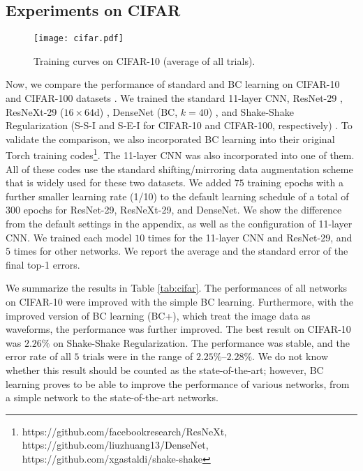 \documentclass[10pt,twocolumn,letterpaper]{article}
\begin{document}
\subsection{Experiments on CIFAR}
\begin{figure*}
\begin{center}
	\texttt{[image: cifar.pdf]}
\end{center}
\vspace{-3mm}
   \caption{Training curves on CIFAR-10 (average of all trials).}
\label{fig:cifar}
\vspace{-2mm}
\end{figure*}

Now, we compare the performance of standard and BC learning on CIFAR-10 and CIFAR-100 datasets \cite{krizhevsky2009learning}. We trained the standard 11-layer CNN, ResNet-29 \cite{xie2017aggregated}, ResNeXt-29 ($16\times64$d) \cite{xie2017aggregated}, DenseNet (BC, $k=40$) \cite{huang2017densely}, and Shake-Shake Regularization (S-S-I and S-E-I for CIFAR-10 and CIFAR-100, respectively) \cite{gastaldi2017shake}. To validate the comparison, we also incorporated BC learning into their original Torch \cite{collobert2002torch} training codes\footnote{https://github.com/facebookresearch/ResNeXt, https://github.com/\newline liuzhuang13/DenseNet, https://github.com/xgastaldi/shake-shake}. The 11-layer CNN was also incorporated into one of them. All of these codes use the standard shifting/mirroring data augmentation scheme that is widely used for these two datasets. We added $75$ training epochs with a further smaller learning rate (1/10) to the default learning schedule of a total of $300$ epochs for ResNet-29, ResNeXt-29, and DenseNet. We show the difference from the default settings in the appendix, as well as the configuration of 11-layer CNN. We trained each model $10$ times for the 11-layer CNN and ResNet-29, and $5$ times for other networks. We report the average and the standard error of the final top-1 errors.

We summarize the results in Table \ref{tab:cifar}. The performances of all networks on CIFAR-10 were improved with the simple BC learning. Furthermore, with the improved version of BC learning (BC+), which treat the image data as waveforms, the performance was further improved. The best result on CIFAR-10 was $2.26\%$ on Shake-Shake Regularization. The performance was stable, and the error rate of all $5$ trials were in the range of $2.25\%$--$2.28\%$. We do not know whether this result should be counted as the state-of-the-art; however, BC learning proves to be able to improve the performance of various networks, from a simple network to the state-of-the-art networks.
\end{document}
